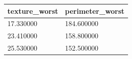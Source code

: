\begin{tabular}{p{2.5cm}p{2.5cm}}
\toprule
texture\_worst & perimeter\_worst \\
\midrule
17.330000 & 184.600000 \\
23.410000 & 158.800000 \\
25.530000 & 152.500000 \\
\bottomrule
\end{tabular} 